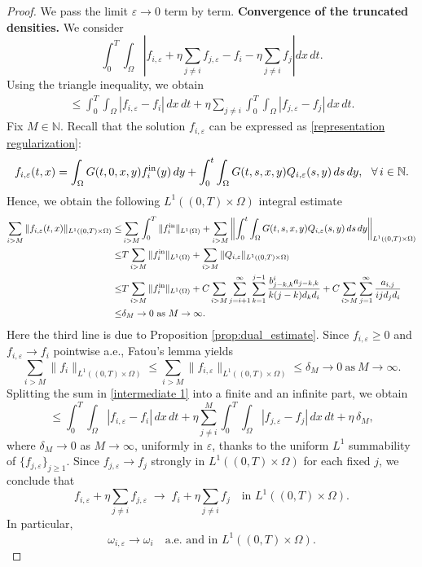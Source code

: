 \documentclass[a4paper,12pt,reqno]{amsart}
\theoremstyle{plain}
\numberwithin{equation}{section}
\begin{document}
	\begin{proof}
		We pass the limit $\varepsilon\to 0$ term by term.
		\newline
		\textbf{Convergence of the truncated densities.}
		We consider
		\[
		\int_{0}^{T}\!\!\int_{\Omega}
		\left|
		f_{i,\varepsilon}
		+ \eta \sum_{j\ne i} f_{j,\varepsilon}
		-
		f_i
		- \eta \sum_{j\ne i} f_j
		\right| dx\,dt .
		\]
		Using the triangle inequality, we obtain
		\begin{align}\label{intermediate 1}
			\le
			\int_{0}^{T}\!\!\int_{\Omega}
			|f_{i,\varepsilon}-f_i|\,dx\,dt
			+
			\eta \sum_{j\ne i}
			\int_{0}^{T}\!\!\int_{\Omega}
			|f_{j,\varepsilon}-f_j|\,dx\,dt .
		\end{align}
		Fix $M\in\mathbb{N}$. Recall that the solution $f_{i,\varepsilon}$ can be expressed as \eqref{representation regularization}:
		\[
		f_{i,\varepsilon}(t,x)= \int_{\Omega}G(t,0,x,y)f_i^{\rm{in}}(y)\, dy+\int_{0}^{t}\int_{\Omega} G(t,s,x,y)Q_{i,\varepsilon}(s,y) \, ds\, dy, \ \ \forall \, i\in\mathbb{N}.
		\]
		Hence, we obtain the following $L^1((0,T)\times\Omega)$ integral estimate
		\begin{align*}
			\sum_{i>M} \|f_{i,\varepsilon}(t,x)\|_{L^1((0,T)\times\Omega)} \leq &\sum_{i>M} \int_0^T\| f_i^{\rm{in}}\|_{L^1(\Omega)}+ \sum_{i>M} \left\| \int_{0}^{t}\int_{\Omega} G(t,s,x,y)Q_{i,\varepsilon}(s,y) \, ds\, dy\right\|_{L^1((0,T)\times\Omega)}\\
			\leq &T\sum_{i>M} \| f_i^{\rm{in}}\|_{L^1(\Omega)}+\sum_{i>M} \| Q_{i,\varepsilon}\|_{L^1((0,T)\times\Omega)} \\\leq & T\sum_{i>M} \| f_i^{\rm{in}}\|_{L^1(\Omega)}+C\sum_{i>M}
			\sum_{j=i+1}^{\infty} \sum_{k=1}^{j-1}
			\frac{b_{j-k,k}^i a_{j-k,k}}{k(j-k)d_{k}d_i}+C\sum_{i>M}
			\sum_{j=1}^{\infty}
			\frac{a_{i,j}}{ijd_jd_i} \\
			\leq & \delta_M\to 0 \ \mbox{as}\ M\to \infty.
		\end{align*}
		Here the third line is due to Proposition \ref{prop:dual_estimate}. Since $f_{i,\varepsilon}\ge0$ and $f_{i,\varepsilon}\to f_i$ pointwise a.e.,
		Fatou's lemma yields
		\[
		\sum_{i>M} \|f_{i}\|_{L^1((0,T)\times\Omega)} \leq \sum_{i>M} \|f_{i,\varepsilon}\|_{L^1((0,T)\times\Omega)}\leq \delta_M\to 0 \ \mbox{as}\ M\to \infty.
		\]
		Splitting the sum in \eqref{intermediate 1} into a finite and an infinite part,
		we obtain
		\[
		\le
		\int_{0}^{T}\!\!\int_{\Omega}
		|f_{i,\varepsilon}-f_i|\,dx\,dt
		+
		\eta \sum_{j\ne i}^{M}
		\int_{0}^{T}\!\!\int_{\Omega}
		|f_{j,\varepsilon}-f_j|\,dx\,dt
		+
		\eta\,\delta_M,
		\]
		where $\delta_M\to0$ as $M\to\infty$, uniformly in $\varepsilon$, thanks to
		the uniform $L^1$ summability of $\{f_{j,\varepsilon}\}_{j\ge1}$.
		Since $f_{j,\varepsilon}\to f_j$ strongly in $L^1((0,T)\times\Omega)$ for
		each fixed $j$, we conclude that
		\[
		f_{i,\varepsilon}
		+ \eta \sum_{j\ne i} f_{j,\varepsilon}
		\;\longrightarrow\;
		f_i + \eta \sum_{j\ne i} f_j
		\quad \text{in } L^1((0,T)\times\Omega).
		\]
		In particular,
		\[
		\omega_{i,\varepsilon}
		\longrightarrow
		\omega_i
		\quad \text{a.e. and in } L^1((0,T)\times\Omega).
		\]
		

\end{proof}
\end{document}
